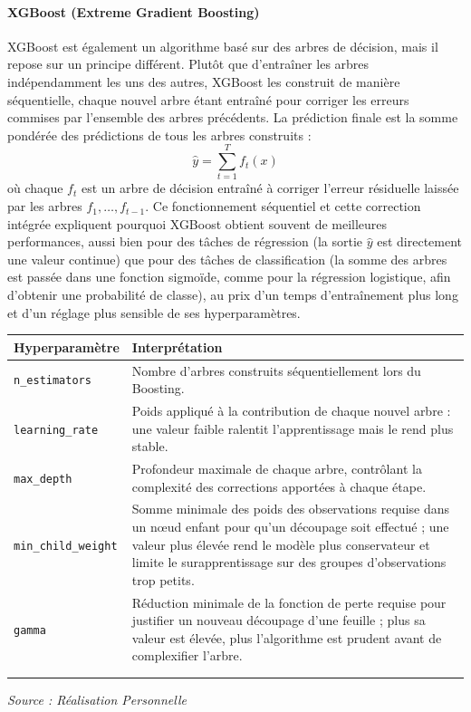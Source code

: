\documentclass[a4paper,12pt, oneside]{article}
\begin{document}
\paragraph{XGBoost (Extreme Gradient Boosting)\\}
XGBoost est également un algorithme basé sur des arbres de décision, mais il repose sur un principe différent. Plutôt que d'entraîner les arbres indépendamment les uns des autres, XGBoost les construit de manière séquentielle, chaque nouvel arbre étant entraîné pour corriger les erreurs commises par l'ensemble des arbres précédents. La prédiction finale est la somme pondérée des prédictions de tous les arbres construits :
\[
\hat{y} = \sum_{t=1}^{T} f_t(x)
\]
où chaque $f_t$ est un arbre de décision entraîné à corriger l'erreur résiduelle laissée par les arbres $f_1, \dots, f_{t-1}$. Ce fonctionnement séquentiel et cette correction intégrée expliquent pourquoi XGBoost obtient souvent de meilleures performances, aussi bien pour des tâches de régression (la sortie $\hat{y}$ est directement une valeur continue) que pour des tâches de classification (la somme des arbres est passée dans une fonction sigmoïde, comme pour la régression logistique, afin d'obtenir une probabilité de classe), au prix d'un temps d'entraînement plus long et d'un réglage plus sensible de ses hyperparamètres.

\begin{longtable}{|m{5cm}|m{12cm}|}
\hline
\textbf{Hyperparamètre} & \textbf{Interprétation} \\
\hline
\texttt{n\_estimators} & Nombre d'arbres construits séquentiellement lors du Boosting. \\
\hline
\texttt{learning\_rate} & Poids appliqué à la contribution de chaque nouvel arbre : une valeur faible ralentit l'apprentissage mais le rend plus stable. \\
\hline
\texttt{max\_depth} & Profondeur maximale de chaque arbre, contrôlant la complexité des corrections apportées à chaque étape. \\
\hline
\texttt{min\_child\_weight} & Somme minimale des poids des observations requise dans un nœud enfant pour qu'un découpage soit effectué ; une valeur plus élevée rend le modèle plus conservateur et limite le surapprentissage sur des groupes d'observations trop petits. \\
\hline
\texttt{gamma} & Réduction minimale de la fonction de perte requise pour justifier un nouveau découpage d'une feuille ; plus sa valeur est élevée, plus l'algorithme est prudent avant de complexifier l'arbre. \\
\hline
\caption{Hyperparamètres -- XGBoost\\}
\end{longtable}
\begin{center}
\vspace{-0.85cm}
\textit{Source : Réalisation Personnelle}
\end{center}
\end{document}
